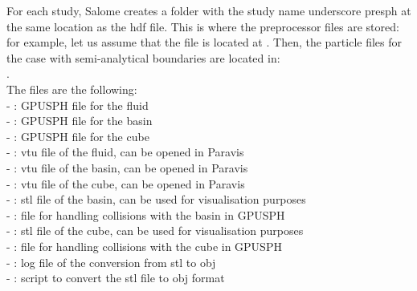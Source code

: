 \documentclass{../GPUSPHtemplate}
\begin{document}
\begin{enumerate}
\begin{itemize}
    For each study, Salome creates a folder with the study name underscore presph at the same location as the hdf file.
    This is where the preprocessor files are stored: for example, let us assume that the  file
    is located at .
    Then, the particle files for the case with semi-analytical boundaries are located in:\\
    . \\
    The files are the following:\\
    - :  GPUSPH file for the fluid\\
    - : GPUSPH file for the basin\\
    - :  GPUSPH file for the cube\\
    - : vtu file of the fluid, can be opened in Paravis\\
    - : vtu file of the basin, can be opened in Paravis\\
    - : vtu file of the cube, can be opened in Paravis\\
    - : stl file of the basin, can be used for visualisation purposes\\
    - : file for handling collisions with the basin in GPUSPH\\
    - : stl file of the cube, can be used for visualisation purposes\\
    - : file for handling collisions with the cube in GPUSPH\\
    - : log file of the conversion from stl to obj\\
    - : script to convert the stl file to obj format
  \end{itemize}
  

\end{enumerate}
\end{document}
